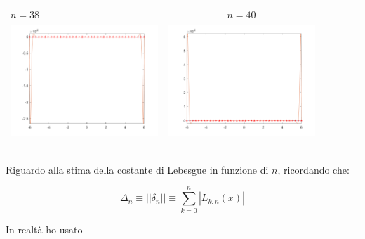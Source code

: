 \begin{tabular}{l*{5}{c}}
\hspace{3.5cm}\(n=38\) &  \(n=40\) \\
\includegraphics[scale=0.5]{cap4/4_9/38.png} &  \includegraphics[scale=0.5]{cap4/4_9/40.png} \\
& \\
& \\
& \\
\end{tabular}

\noindent Riguardo alla stima della costante di Lebesgue in funzione di \(n\), ricordando che:

\[
\Delta_n \equiv ||\delta_n|| \equiv \sum^n_{k=0}|L_{k,n}(x)|
\]

In realtà ho usato

